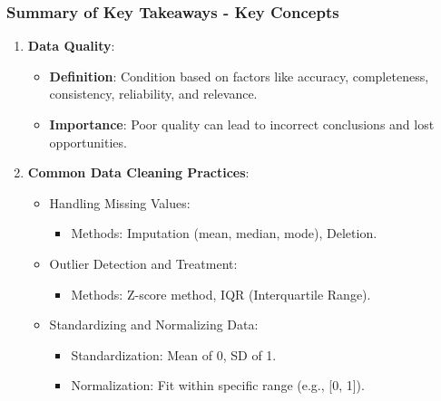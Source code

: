 \documentclass[aspectratio=169]{beamer}
\begin{document}
\begin{frame}[fragile]
    \frametitle{Summary of Key Takeaways - Key Concepts}
    \begin{enumerate}
        \item \textbf{Data Quality}:
        \begin{itemize}
            \item \textbf{Definition}: Condition based on factors like accuracy, completeness, consistency, reliability, and relevance.
            \item \textbf{Importance}: Poor quality can lead to incorrect conclusions and lost opportunities.
        \end{itemize}
        
        \item \textbf{Common Data Cleaning Practices}:
        \begin{itemize}
            \item Handling Missing Values: 
            \begin{itemize}
                \item Methods: Imputation (mean, median, mode), Deletion.
            \end{itemize}
            
            \item Outlier Detection and Treatment:
            \begin{itemize}
                \item Methods: Z-score method, IQR (Interquartile Range).
            \end{itemize}

            \item Standardizing and Normalizing Data: 
            \begin{itemize}
                \item Standardization: Mean of 0, SD of 1. 
                \item Normalization: Fit within specific range (e.g., [0, 1]).
            \end{itemize}
        \end{itemize}
    \end{enumerate}
\end{frame}
\end{document}
